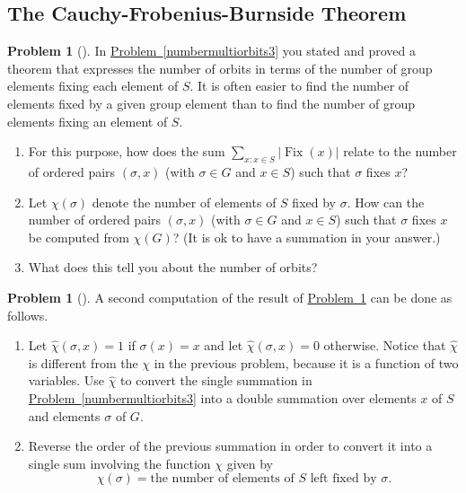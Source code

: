 \documentclass[10pt,]{book}
\theoremstyle{plain}
\theoremstyle{definition}
\newtheorem{activity}[project]{Problem}
\theoremstyle{definition}
\numberwithin{equation}{chapter}
\DeclareMathOperator{\Fix}{Fix}
\begin{document}
\subsection[{The Cauchy-Frobenius-Burnside Theorem}]{The Cauchy-Frobenius-Burnside Theorem}\label{subsection-67}
\begin{activity}[] \label{numbermultiorbits4}
\hypertarget{p-1687}{}%
In \hyperref[numbermultiorbits3]{Problem~\ref{numbermultiorbits3}} you stated and proved a theorem that expresses the number of orbits in terms of the number of group elements fixing each element of \(S\). It is often easier to find the number of elements fixed by a given group element than to find the number of group elements fixing an element of \(S\).%
\begin{enumerate}[font=\bfseries,label=(\alph*),ref=\alph*]
\item\label{task-225} \marginsymbol[-2.5em]{} \hypertarget{p-1688}{}%
For this purpose, how does the sum \(\sum_{x\colon x\in S}|\Fix(x)|\) relate to the number of ordered pairs \((\sigma,x)\) (with \(\sigma\in G\) and \(x \in S\)) such that \(\sigma\) fixes \(x\)?%
\item\label{task-226} \marginsymbol[-2.5em]{} \hypertarget{p-1690}{}%
Let \(\chi(\sigma)\) denote the number of elements of \(S\) fixed by \(\sigma\). How can the number of ordered pairs \((\sigma,x)\) (with \(\sigma\in G\) and \(x\in S\)) such that \(\sigma\) fixes \(x\) be computed from \(\chi(G)\)? (It is ok to have a summation in your answer.)%
\item\label{task-227} \marginsymbol[-2.5em]{} \hypertarget{p-1692}{}%
What does this tell you about the number of orbits?%
\end{enumerate}
\end{activity}
\begin{activity}[]\marginsymbol[-1em]{} \label{numbermultiorbits5}
\hypertarget{p-1694}{}%
A second computation of the result of \hyperref[numbermultiorbits4]{Problem~\ref{numbermultiorbits4}} can be done as follows.%
\begin{enumerate}[font=\bfseries,label=(\alph*),ref=\alph*]
\item\label{task-228} \marginsymbol[-2.5em]{} \hypertarget{p-1695}{}%
Let \(\widehat{\chi}(\sigma,x)=1\) if \(\sigma(x)=x\) and let \(\widehat{\chi}(\sigma,x) =0\) otherwise.  Notice that \(\widehat{\chi}\) is different from the \(\chi\) in the previous problem, because it is a function of two variables. Use \(\widehat{\chi}\) to convert the single summation in \hyperref[numbermultiorbits3]{Problem~\ref{numbermultiorbits3}} into a double summation over elements \(x\) of \(S\) and elements \(\sigma\) of \(G\).%
\item\label{task-229} \marginsymbol[-2.5em]{} \hypertarget{p-1697}{}%
Reverse the order of the previous summation in order to convert it into a single sum involving the function \(\chi\) given by%
\begin{equation*}
\chi(\sigma) =
\mbox{the number of elements of \(S\) left fixed by \(\sigma\)} .
\end{equation*}
%
\end{enumerate}
\end{activity}
\end{document}
